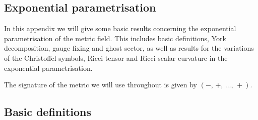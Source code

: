 \documentclass[11pt]{book}
\numberwithin{equation}{chapter}
\begin{document}

\nocite{*}






\appendix
\begin{appendices}

\chapter{Exponential parametrisation}
\label{app:exp_param}

In this appendix we will give some basic results concerning the exponential parametrisation
of the metric field. This includes basic definitions, York decomposition, gauge fixing and
ghost sector, as well as results for the variations of the Christoffel symbols, Ricci tensor
and Ricci scalar curvature in the exponential parametrisation.

The signature of the metric we will use throughout is given by $(-,\, +,\, \dots,\, +)$.

\section{Basic definitions}


\end{appendices}
\end{document}
